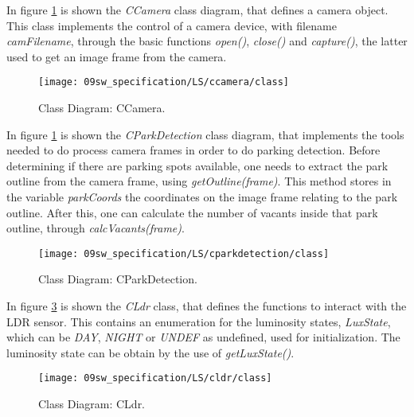
In figure \ref{fig:classcamera} is shown the \textit{CCamera} class diagram, that defines a camera object.  This class implements the control of a camera device, with filename \textit{camFilename}, through the basic functions \textit{open()}, \textit{close()} and \textit{capture()}, the latter used to get an image frame from the camera.

\begin{figure}[H]
	\centering
	\texttt{[image: 09sw\_specification/LS/ccamera/class]}
	\caption{Class Diagram: CCamera.}
	\label{fig:classcamera}
\end{figure}

\clearpage
{}

In figure \ref{fig:classcamera} is shown the \textit{CParkDetection} class diagram, that implements the tools needed to do process camera frames in order to do parking detection. Before determining if there are parking spots available, one needs to extract the park outline from the camera frame, using \textit{getOutline(frame)}. This method stores in the variable \textit{parkCoords} the coordinates on the image frame relating to the park outline. After this, one can calculate the number of vacants inside that park outline, through \textit{calcVacants(frame)}.

\begin{figure}[H]
	\centering
	\texttt{[image: 09sw\_specification/LS/cparkdetection/class]}
	\caption{Class Diagram: CParkDetection.}
	\label{fig:classparkdetection}
\end{figure}

\clearpage
{}

In figure \ref{fig:classldr} is shown the \textit{CLdr} class, that defines the functions to interact with the LDR sensor. This contains an enumeration for the luminosity states, \textit{LuxState}, which can be \textit{DAY}, \textit{NIGHT} or \textit{UNDEF} as undefined, used for initialization. The luminosity state can be obtain by the use of \textit{getLuxState()}. 

\begin{figure}[H]
	\centering
	\texttt{[image: 09sw\_specification/LS/cldr/class]}
	\caption{Class Diagram: CLdr.}
	\label{fig:classldr}
\end{figure}

